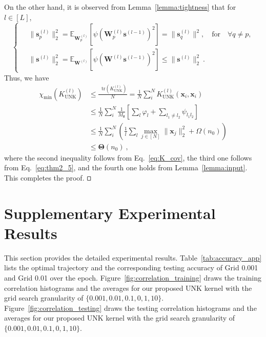 \documentclass[review,10pt]{JMtemplate}
\newcommand*{\tr}{\mathop{}\!\mathrm{tr}}
\begin{document}
On the other hand, it is observed from Lemma~\ref{lemma:tightness} that for $l \in [L]$,
\begin{equation} \label{eq:thm2_5}
\left\{~\begin{aligned}
& \| \boldsymbol{s}_p^{(l)} \|^2_2 = \mathbb{E}_{\mathbf{W}^{(l)}_p} \left[ \psi(\mathbf{W}^{(l)}_p\boldsymbol{s}^{(l-1)})^2 \right] = \| \boldsymbol{s}_q^{(l)} \|^2, \quad\text{for}\quad \forall q \neq p ,\\
&\| \boldsymbol{s}^{(l)} \|_2^2 = \mathbb{E}_{\mathbf{W}^{(l)}} \left[ \psi(\mathbf{W}^{(l)}\boldsymbol{s}^{(l-1)})^2 \right] \leq \| \boldsymbol{s}^{(l)} \|_2^2 \ . 
\end{aligned}\right.
\end{equation}
Thus, we have
\[
\begin{aligned}
	\chi_{\min}( K_{\textrm{UNK}}^{(l)} ) &\leq \frac{\tr( K_{\textrm{UNK}}^{(l)} )}{N} = \frac{1}{N} \sum_{i}^{N} K_{\textrm{UNK}}^{(l)}(\boldsymbol{x}_i, \boldsymbol{x}_i) \\
	& \leq  \frac{1}{N} \sum_{i}^{N} \frac{1}{M_{\boldsymbol{z}}} \left[ \sum_{l} \varphi_{l} + \sum_{l_1 \neq l_2} \psi_{l_1l_2} \right] \\
	&\leq \frac{1}{N} \sum_{i}^{N}\left( \frac{1}{l} \sum_{l} \max_{j\in[N]} \|\boldsymbol{x}_j\|_2^2 + \Omega(n_0) \right) \\
	&\leq \mathbf{\Theta}(n_0) \ ,
\end{aligned}
\]
where the second inequality follows from Eq.~\eqref{eq:K_cov}, the third one follows from Eq.~\eqref{eq:thm2_5}, and the fourth one holds from Lemma~\ref{lemma:input}. This completes the proof. $\hfill\square$


\section{Supplementary Experimental Results}  \label{app:experiments}
This section provides the detailed experimental results.
Table~\ref{tab:accuracy_app} lists the optimal trajectory and the corresponding testing accuracy of Grid 0.001 and Grid 0.01 over the epoch. Figure~\ref{fig:correlation_training} draws the training correlation histograms and the averages for our proposed UNK kernel with the grid search granularity of $\{0.001, 0.01, 0.1, 0, 1, 10\}$. Figure~\ref{fig:correlation_testing} draws the testing correlation histograms and the averages for our proposed UNK kernel with the grid search granularity of $\{0.001, 0.01, 0.1, 0, 1, 10\}$. 
\end{document}
